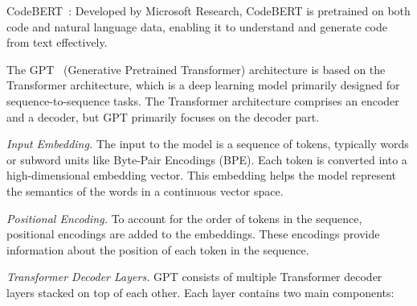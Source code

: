 
CodeBERT~\cite{feng2020codebert}: Developed by Microsoft Research,
CodeBERT is pretrained on both code and natural language data,
enabling it to understand and generate code from text effectively.


The GPT~\cite{GPT} (Generative Pretrained Transformer) architecture is based on the Transformer architecture, which is a deep learning model primarily designed for sequence-to-sequence tasks. The Transformer architecture comprises an encoder and a decoder, but GPT primarily focuses on the decoder part.


{\em Input Embedding.} The input to the model is a sequence of tokens, typically words or subword units like Byte-Pair Encodings (BPE). Each token is converted into a high-dimensional embedding vector. This embedding helps the model represent the semantics of the words in a continuous vector space.


{\em Positional Encoding.} To account for the order of tokens in the sequence, positional encodings are added to the embeddings. These encodings provide information about the position of each token in the sequence.


{\em Transformer Decoder Layers.} GPT consists of multiple Transformer
decoder layers stacked on top of each other. Each layer contains two
main components:

